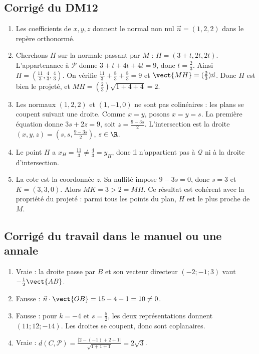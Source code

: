 \subsection{Corrigé du DM12}\begin{enumerate}
\item Les coefficients de $x,y,z$ donnent le normal non nul $\vec n=(1,2,2)$ dans le repère orthonormé.
\item Cherchons $H$ sur la normale passant par $M$ : $H=(3+t,2t,2t)$. L'appartenance à $\mathcal P$ donne $3+t+4t+4t=9$, donc $t=\frac{2}{3}$. Ainsi $H=(\frac{11}{3},\frac{4}{3},\frac{4}{3})$. On vérifie $\frac{11}{3}+\frac{8}{3}+\frac{8}{3}=9$ et $\vect{MH}=(\frac{2}{3})\vec{n}$. Donc $H$ est bien le projeté, et $MH=(\frac{2}{3})\sqrt{1+4+4}=2$.
\item Les normaux $(1,2,2)$ et $(1,-1,0)$ ne sont pas colinéaires : les plans se coupent suivant une droite. Comme $x=y$, posons $x=y=s$. La première équation donne $3s+2z=9$, soit $z=\frac{9-3s}{2}$. L'intersection est la droite $(x,y,z)=(s,s,\frac{9-3s}{2})$, $s\in\R$.
\item Le point $H$ a $x_H=\frac{11}{3}\ne\frac{4}{3}=y_H$, donc il n'appartient pas à $\mathcal Q$ ni à la droite d'intersection.
\item La cote est la coordonnée $z$. Sa nullité impose $9-3s=0$, donc $s=3$ et $K=(3,3,0)$. Alors $MK=3>2=MH$. Ce résultat est cohérent avec la propriété du projeté : parmi tous les points du plan, $H$ est le plus proche de $M$.
\end{enumerate}

\subsection{Corrigé du travail dans le manuel ou une annale}\begin{enumerate}
\item Vraie : la droite passe par $B$ et son vecteur directeur $(-2;-1;3)$ vaut $-\frac12\vect{AB}$.
\item Fausse : $\vec n\cdot\vect{OB}=15-4-1=10\ne0$.
\item Fausse : pour $k=-4$ et $s=\frac52$, les deux représentations donnent $(11;12;-14)$. Les droites se coupent, donc sont coplanaires.
\item Vraie : $d(C,\mathcal P)=\frac{|2-(-1)+2+1|}{\sqrt{1+1+1}}=2\sqrt3$.
\end{enumerate}

\fi

